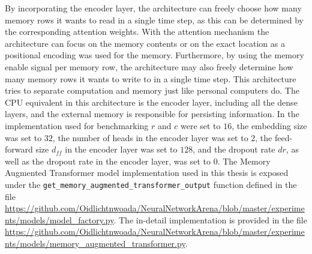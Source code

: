 \documentclass[draft,final]{vutinfth} %
\begin{document}
    By incorporating the encoder layer, the architecture can freely choose how many memory rows it wants to read in a single time step, as this can be determined by the corresponding attention weights.
    With the attention mechanism the architecture can focus on the memory contents or on the exact location as a positional encoding was used for the memory.
    Furthermore, by using the memory enable signal per memory row, the architecture may also freely determine how many memory rows it wants to write to in a single time step.
    This architecture tries to separate computation and memory just like personal computers do. 
    The CPU equivalent in this architecture is the encoder layer, including all the dense layers, and the external memory is responsible for persisting information.
    In the implementation used for benchmarking $r$ and $c$ were set to $16$, the embedding size was set to $32$, the number of heads in the encoder layer was set to $2$,
    the feed-forward size $d_{ff}$ in the encoder layer was set to $128$, and the dropout rate $dr$, as well as the dropout rate in the encoder layer, was set to $0$.
    The Memory Augmented Transformer model implementation used in this thesis is exposed under the \texttt{get\_memory\_augmented\_transformer\_output} function defined in the file \url{https://github.com/Oidlichtnwoada/NeuralNetworkArena/blob/master/experiments/models/model_factory.py}.
    The in-detail implementation is provided in the file \url{https://github.com/Oidlichtnwoada/NeuralNetworkArena/blob/master/experiments/models/memory_augmented_transformer.py}.
\end{document}
